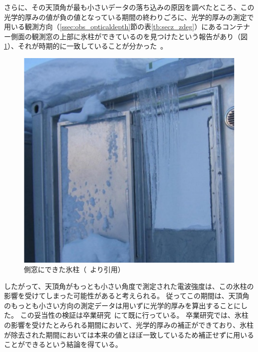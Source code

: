 さらに、その天頂角が最も小さいデータの落ち込みの原因を調べたところ、この光学的厚みの値が負の値となっている期間の終わりごろに、光学的厚みの測定で用いる観測方向（\ref{ssec:obs_opticaldepth}節の表\ref{tb:secz_zdeg}）にあるコンテナー側面の観測窓の上部に氷柱ができているのを見つけたという報告があり（図\ref{fig:icicles}）、それが時期的に一致していることが分かった~\cite{goto2021bachelor}。
\begin{figure}[htbp]
    \centering
    \includegraphics[width=\linewidth]{master_thesis_contents/master_thesis_fig/icicles.pdf}
    \caption{側窓にできた氷柱（~\cite{goto2021bachelor}より引用）}
    \label{fig:icicles}
\end{figure}
したがって、天頂角がもっとも小さい角度で測定された電波強度は、この氷柱の影響を受けてしまった可能性があると考えられる。
従ってこの期間は、天頂角のもっとも小さい方向の測定データは用いずに光学的厚みを算出することにした。
この妥当性の検証は卒業研究~\cite{goto2021bachelor}にて既に行っている。
卒業研究では、氷柱の影響を受けたとみられる期間において、光学的厚みの補正ができており、氷柱が除去された期間においては本来の値とほぼ一致しているため補正せずに用いることができるという結論を得ている。



